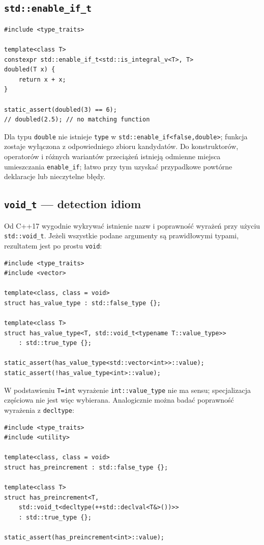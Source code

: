 \subsection{\texttt{std::enable\_if\_t}}

\begin{lstlisting}
#include <type_traits>

template<class T>
constexpr std::enable_if_t<std::is_integral_v<T>, T>
doubled(T x) {
    return x + x;
}

static_assert(doubled(3) == 6);
// doubled(2.5); // no matching function
\end{lstlisting}

Dla typu \texttt{double} nie istnieje \texttt{type} w
\texttt{std::enable\_if<false,double>}; funkcja zostaje wyłączona
z odpowiedniego zbioru kandydatów. Do konstruktorów, operatorów i
różnych wariantów przeciążeń istnieją odmienne miejsca umieszczania
\texttt{enable\_if}; łatwo przy tym uzyskać przypadkowe powtórne
deklaracje lub nieczytelne błędy.

\subsection{\texttt{void\_t} — detection idiom}

Od C++17 wygodnie wykrywać istnienie nazw i poprawność wyrażeń przy
użyciu \texttt{std::void\_t}. Jeżeli wszystkie podane argumenty
są prawidłowymi typami, rezultatem jest po prostu \texttt{void}:

\begin{lstlisting}
#include <type_traits>
#include <vector>

template<class, class = void>
struct has_value_type : std::false_type {};

template<class T>
struct has_value_type<T, std::void_t<typename T::value_type>>
    : std::true_type {};

static_assert(has_value_type<std::vector<int>>::value);
static_assert(!has_value_type<int>::value);
\end{lstlisting}

W podstawieniu \texttt{T=int} wyrażenie \texttt{int::value\_type}
nie ma sensu; specjalizacja częściowa nie jest więc wybierana.
Analogicznie można badać poprawność wyrażenia z \texttt{decltype}:

\begin{lstlisting}
#include <type_traits>
#include <utility>

template<class, class = void>
struct has_preincrement : std::false_type {};

template<class T>
struct has_preincrement<T,
    std::void_t<decltype(++std::declval<T&>())>>
    : std::true_type {};

static_assert(has_preincrement<int>::value);
\end{lstlisting}

